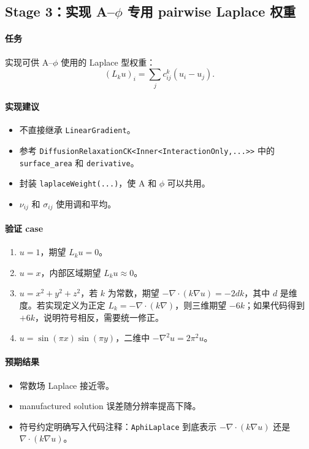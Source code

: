 \documentclass[UTF8,a4paper,11pt]{ctexart}
\newcommand{\code}[1]{\texttt{#1}}
\begin{document}
\subsection{Stage 3：实现 A--$\phi$ 专用 pairwise Laplace 权重}

\paragraph{任务}
实现可供 A--$\phi$ 使用的 Laplace 型权重：
\begin{equation}
(L_k u)_i=\sum_j c^k_{ij}(u_i-u_j).
\end{equation}

\paragraph{实现建议}
\begin{itemize}
  \item 不直接继承 \code{LinearGradient}。
  \item 参考 \code{DiffusionRelaxationCK<Inner<InteractionOnly,...>>} 中的 \code{surface\_area} 和 \code{derivative}。
  \item 封装 \code{laplaceWeight(...)}，使 A 和 $\phi$ 可以共用。
  \item $\nu_{ij}$ 和 $\sigma_{ij}$ 使用调和平均。
\end{itemize}

\paragraph{验证 case}
\begin{enumerate}
  \item $u=1$，期望 $L_k u=0$。
  \item $u=x$，内部区域期望 $L_k u\approx 0$。
  \item $u=x^2+y^2+z^2$，若 $k$ 为常数，期望 $-\nabla\cdot(k\nabla u)=-2dk$，其中 $d$ 是维度。若实现定义为正定 $L_k=-\nabla\cdot(k\nabla)$，则三维期望 $-6k$；如果代码得到 $+6k$，说明符号相反，需要统一修正。
  \item $u=\sin(\pi x)\sin(\pi y)$，二维中 $-\nabla^2 u=2\pi^2u$。
\end{enumerate}

\paragraph{预期结果}
\begin{itemize}
  \item 常数场 Laplace 接近零。
  \item manufactured solution 误差随分辨率提高下降。
  \item 符号约定明确写入代码注释：\code{AphiLaplace} 到底表示 $-\nabla\cdot(k\nabla u)$ 还是 $\nabla\cdot(k\nabla u)$。
\end{itemize}
\end{document}
